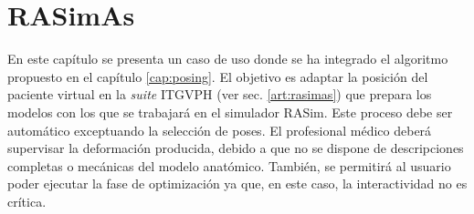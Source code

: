 \chapter{RASimAs} 
\label{cap:rasim}


En este capítulo se presenta un caso de uso donde se ha integrado el algoritmo propuesto en el capítulo \ref{cap:posing}. El objetivo es adaptar la posición del paciente virtual en la \emph{suite} \ac{ITGVPH} (ver sec. \ref{art:rasimas}) que prepara los modelos con los que se trabajará en el simulador \ac{RASim}. Este proceso debe ser automático exceptuando la selección de poses. El profesional médico deberá supervisar la deformación producida, debido a que no se dispone de descripciones completas o mecánicas del modelo anatómico. También, se permitirá al usuario poder ejecutar la fase de optimización ya que, en este caso, la interactividad no es crítica. %






